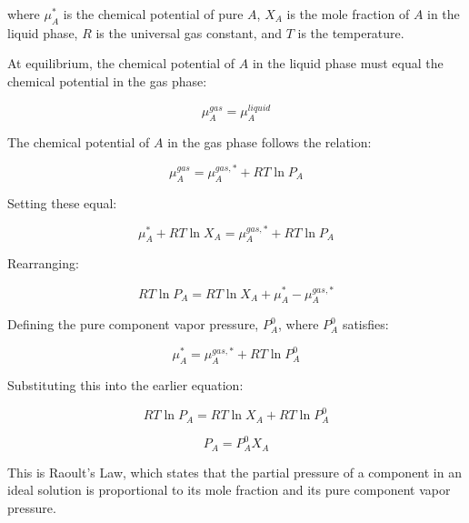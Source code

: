 \documentclass{article}
\theoremstyle{definition}
\begin{document}
where $\mu_A^*$ is the chemical potential of pure $A$, $X_A$ is the mole fraction of $A$ in the liquid phase, $R$ is the universal gas constant, and $T$ is the temperature.

At equilibrium, the chemical potential of $A$ in the liquid phase must equal the chemical potential in the gas phase:

\begin{equation}
\mu_A^{gas} = \mu_A^{liquid}
\end{equation}

The chemical potential of $A$ in the gas phase follows the relation:

\begin{equation}
\mu_A^{gas} = \mu_A^{gas,*} + RT \ln P_A
\end{equation}

Setting these equal:

\begin{equation}
\mu_A^* + RT \ln X_A = \mu_A^{gas,*} + RT \ln P_A
\end{equation}

Rearranging:

\begin{equation}
RT \ln P_A = RT \ln X_A + \mu_A^* - \mu_A^{gas,*}
\end{equation}

Defining the pure component vapor pressure, $P_A^0$, where $P_A^0$ satisfies:

\begin{equation}
\mu_A^* = \mu_A^{gas,*} + RT \ln P_A^0
\end{equation}

Substituting this into the earlier equation:

\begin{equation}
RT \ln P_A = RT \ln X_A + RT \ln P_A^0
\end{equation}

\begin{equation}
P_A = P_A^0 X_A
\end{equation}

This is Raoult’s Law, which states that the partial pressure of a component in an ideal solution is proportional to its mole fraction and its pure component vapor pressure.
\end{document}
